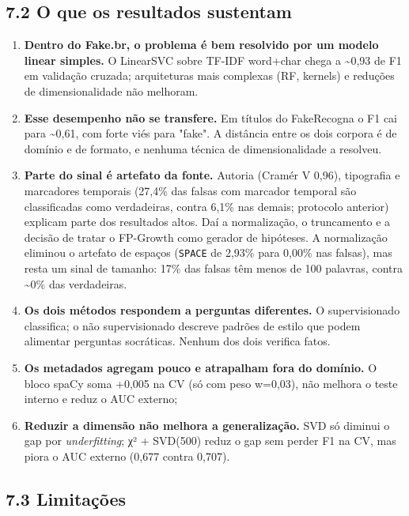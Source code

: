 \documentclass[
  brazilian,
  11pt,
]{article}
\providecommand{\tightlist}{%
  \setlength{\itemsep}{0pt}\setlength{\parskip}{0pt}}
\begin{document}
\subsection{7.2 O que os resultados sustentam}\label{o-que-os-resultados-sustentam}

\begin{enumerate}
\def\labelenumi{\arabic{enumi}.}
\tightlist
\item
  \textbf{Dentro do Fake.br, o problema é bem resolvido por um modelo linear simples.} O LinearSVC sobre TF-IDF word+char chega a \textasciitilde0,93 de F1 em validação cruzada; arquiteturas mais complexas (RF, kernels) e reduções de dimensionalidade não melhoram.
\item
  \textbf{Esse desempenho não se transfere.} Em títulos do FakeRecogna o F1 cai para \textasciitilde0,61, com forte viés para "fake". A distância entre os dois corpora é de domínio e de formato, e nenhuma técnica de dimensionalidade a resolveu.
\item
  \textbf{Parte do sinal é artefato da fonte.} Autoria (Cramér V 0,96), tipografia e marcadores temporais (27,4\% das falsas com marcador temporal são classificadas como verdadeiras, contra 6,1\% nas demais; protocolo anterior) explicam parte dos resultados altos. Daí a normalização, o truncamento e a decisão de tratar o FP-Growth como gerador de hipóteses. A normalização eliminou o artefato de espaços (\texttt{SPACE} de 2,93\% para 0,00\% nas falsas), mas resta um sinal de tamanho: 17\% das falsas têm menos de 100 palavras, contra \textasciitilde0\% das verdadeiras.
\item
  \textbf{Os dois métodos respondem a perguntas diferentes.} O supervisionado classifica; o não supervisionado descreve padrões de estilo que podem alimentar perguntas socráticas. Nenhum dos dois verifica fatos.
\item
  \textbf{Os metadados agregam pouco e atrapalham fora do domínio.} O bloco spaCy soma +0,005 na CV (só com peso w=0,03), não melhora o teste interno e reduz o AUC externo;
\item
  \textbf{Reduzir a dimensão não melhora a generalização.} SVD só diminui o gap por \emph{underfitting}; χ² + SVD(500) reduz o gap sem perder F1 na CV, mas piora o AUC externo (0,677 contra 0,707).
\end{enumerate}

\subsection{7.3 Limitações}\label{limitauxe7uxf5es}
\end{document}
